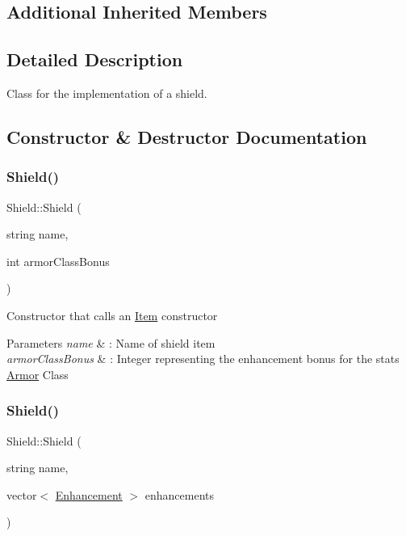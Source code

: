 \subsection*{Additional Inherited Members}


\subsection{Detailed Description}
Class for the implementation of a shield. 

\subsection{Constructor \& Destructor Documentation}
\hypertarget{class_shield_ab14292c5626c5f10a57e727ca298ee49}{}\label{class_shield_ab14292c5626c5f10a57e727ca298ee49} 
\subsubsection{\texorpdfstring{Shield()}{Shield()}\hspace{0.1cm}{\footnotesize\ttfamily [1/2]}}
{\footnotesize\ttfamily Shield\+::\+Shield (\begin{DoxyParamCaption}\item[{string}]{name,  }\item[{int}]{armor\+Class\+Bonus }\end{DoxyParamCaption})}

Constructor that calls an \hyperlink{class_item}{Item} constructor 
\begin{DoxyParams}{Parameters}
{\em name} & \+: Name of shield item \\
\hline
{\em armor\+Class\+Bonus} & \+: Integer representing the enhancement bonus for the stats \hyperlink{class_armor}{Armor} Class \\
\hline
\end{DoxyParams}
\hypertarget{class_shield_ad95eb094f4ed92a7f59694d9a5939565}{}\label{class_shield_ad95eb094f4ed92a7f59694d9a5939565} 
\subsubsection{\texorpdfstring{Shield()}{Shield()}\hspace{0.1cm}{\footnotesize\ttfamily [2/2]}}
{\footnotesize\ttfamily Shield\+::\+Shield (\begin{DoxyParamCaption}\item[{string}]{name,  }\item[{vector$<$ \hyperlink{class_enhancement}{Enhancement} $>$}]{enhancements }\end{DoxyParamCaption})}

